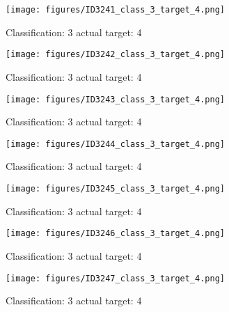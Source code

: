 \begin{figure}[h!]
\begin{center}
\texttt{[image: figures/ID3241\_class\_3\_target\_4.png]}
\end{center}
\caption{ Classification: 3 actual target: 4}
\label{fig:ID3241_class_3_target_4}
\end{figure}
\begin{figure}[h!]
\begin{center}
\texttt{[image: figures/ID3242\_class\_3\_target\_4.png]}
\end{center}
\caption{ Classification: 3 actual target: 4}
\label{fig:ID3242_class_3_target_4}
\end{figure}
\begin{figure}[h!]
\begin{center}
\texttt{[image: figures/ID3243\_class\_3\_target\_4.png]}
\end{center}
\caption{ Classification: 3 actual target: 4}
\label{fig:ID3243_class_3_target_4}
\end{figure}
\begin{figure}[h!]
\begin{center}
\texttt{[image: figures/ID3244\_class\_3\_target\_4.png]}
\end{center}
\caption{ Classification: 3 actual target: 4}
\label{fig:ID3244_class_3_target_4}
\end{figure}
\begin{figure}[h!]
\begin{center}
\texttt{[image: figures/ID3245\_class\_3\_target\_4.png]}
\end{center}
\caption{ Classification: 3 actual target: 4}
\label{fig:ID3245_class_3_target_4}
\end{figure}
\begin{figure}[h!]
\begin{center}
\texttt{[image: figures/ID3246\_class\_3\_target\_4.png]}
\end{center}
\caption{ Classification: 3 actual target: 4}
\label{fig:ID3246_class_3_target_4}
\end{figure}
\begin{figure}[h!]
\begin{center}
\texttt{[image: figures/ID3247\_class\_3\_target\_4.png]}
\end{center}
\caption{ Classification: 3 actual target: 4}
\label{fig:ID3247_class_3_target_4}
\end{figure}
